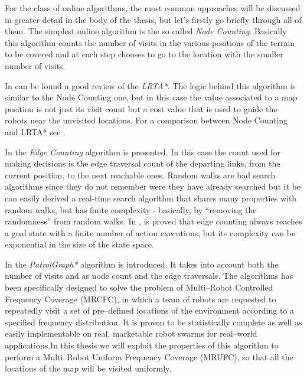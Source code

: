 For the class of online algorithms, the most common approaches will be discussed  in greater detail in the body of the thesis, but let's firstly go briefly through all of them.
The simplest online algorithm is the so called \emph{Node Counting}. Basically this algorithm counts the number of visits in the various positions of the terrain to be covered and at each step chooses to go to the location with the smaller number of visits.

In \cite{Ishida:1998:RSA:608597.608621} can be found a good review of the \emph{LRTA*}. The logic behind this algorithm is similar to the Node Counting one, but in this case the value associated to a map position is not just its visit count but a cost value that is used to guide the robots near the unvisited locations. For a comparison between Node Counting and LRTA* see \cite{koenig2001}.

In \cite{Koenig96easyand} the \emph{Edge Counting} algorithm is presented. In this case the count used for making decisions is the edge traversal count of the departing links, from the current position, to the next reachable ones. Random walks are bad search algorithms since they do not remember were they have already searched but it be can easily derived a real-time search algorithm that shares many properties with random walks, but has finite complexity - basically, by “removing the randomness” from random walks. In \cite{506507}, is proved that edge counting always reaches a goal state with a finite number of action executions, but its complexity can be exponential in the size of the state space.

In \cite{5711675} the \emph{PatrolGraph*} algorithm is introduced. It takes into account both the number of visits and as node count and the edge traversals. The algorithms has been specifically designed to solve the problem of Multi–Robot Controlled Frequency Coverage (MRCFC), in which a team of robots are requested to repeatedly visit a set of pre–defined locations of the environment according to a specified frequency distribution. It is proven to
be statistically complete as well as easily implementable on real, marketable robot swarms for real–world applications.In this thesis we will exploit the properties of this algorithm to perform a Multi–Robot Uniform Frequency Coverage (MRUFC), so that all the locations of the map will be visited uniformly.






